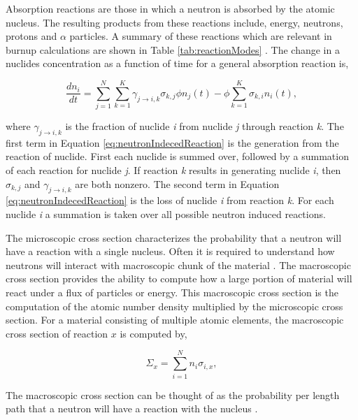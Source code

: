 Absorption reactions are those in which a neutron is absorbed by the atomic nucleus. The resulting products from these reactions include, energy, neutrons, protons and $\alpha$ particles. A summary of these reactions which are relevant in burnup calculations are shown in Table \ref{tab:reactionModes} \cite{pusaThesis}. The change in a nuclides concentration as a function of time for a general absorption reaction is,

\begin{equation}
    \frac{dn_{i}}{dt} = \sum_{j=1}^{N} \sum_{k=1}^{K}\gamma_{j\rightarrow i,k}\sigma_{k,j}\phi n_{j}(t) - \phi\sum_{k=1}^{K} \sigma_{k,i}n_{i}(t),
    \label{eq:neutronIndecedReaction}
\end{equation}

\noindent where $\gamma_{j\rightarrow i,k}$ is the fraction of nuclide \textit{i} from nuclide \textit{j} through reaction \textit{k}. The first term in Equation  \ref{eq:neutronIndecedReaction} is the generation from the reaction of nuclide. First each nuclide is summed over, followed by a summation of each reaction for nuclide \textit{j}. If reaction \textit{k} results in generating nuclide \textit{i}, then $\sigma_{k,j}$ and $\gamma_{j\rightarrow i,k}$ are both nonzero. The second term in Equation \ref{eq:neutronIndecedReaction} is the loss of nuclide \textit{i} from reaction \textit{k}. For each nuclide \textit{i} a summation is taken over all possible neutron induced reactions. 

The microscopic cross section characterizes the probability that a neutron will have a reaction with a single nucleus. Often it is required to understand how neutrons will interact with macroscopic chunk of the material \cite{duderstadt1976}. The macroscopic cross section provides the ability to compute how a large portion of material will react under a flux of particles or energy. This macroscopic cross section is the computation of the atomic number density multiplied by the microscopic cross section. For a material consisting of multiple atomic elements, the macroscopic cross section of reaction $x$ is computed by,

\begin{equation}
    \Sigma_{x} = \sum_{i=1}^{N}n_{i}\sigma_{i,x},
\end{equation}

\noindent The macroscopic cross section can be thought of as the probability per length path that a neutron will have a reaction with the nucleus \cite{duderstadt1976}. 

